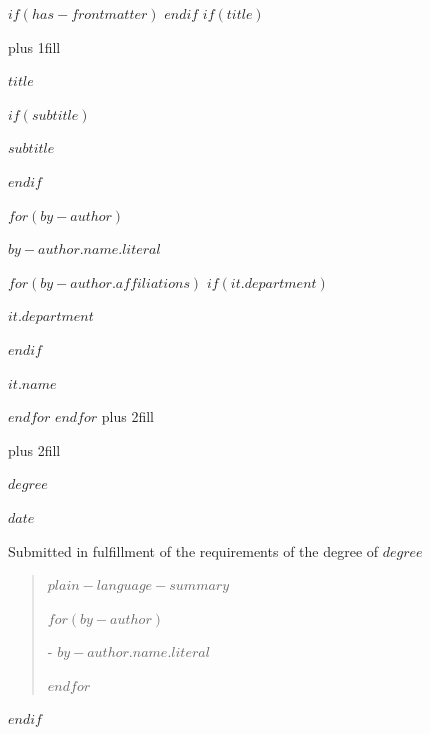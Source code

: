 $if(has-frontmatter)$
\frontmatter
$endif$
$if(title)$
\cleardoublepage
\thispagestyle{empty}
{\centering
\hbox{}\vskip 0cm plus 1fill

{%
\Huge\bfseries $title$ \par}
$if(subtitle)$
\vspace{3ex}
{\Large\bfseries $subtitle$ \par}
$endif$
\vspace{6ex}

$for(by-author)$
    {\Large\bfseries $by-author.name.literal$ \par}
    $for(by-author.affiliations)$%
        $if(it.department)$%
        {\bfseries\large $it.department$ \par}
        \vspace{3ex}
        $endif$%
        {\bfseries\large $it.name$ \par}
    $endfor$%
$endfor$%
\vskip 0cm plus 2fill

{ \par}
\vskip 0cm plus 2fill

{\bfseries\Large\textit{$degree$} \par}
\vspace{3ex}

{\bfseries\large $date$ \par}
\vspace{3ex}

\vspace{12ex}
{\small Submitted in fulfillment of the requirements
of the degree of $degree$ \par}
\pagebreak

\begin{quote}
\raggedright    
$plain-language-summary$ \par
\raggedleft    
$for(by-author)$
    {- $by-author.name.literal$ \par}
$endfor$%
\end{quote}
}
$endif$